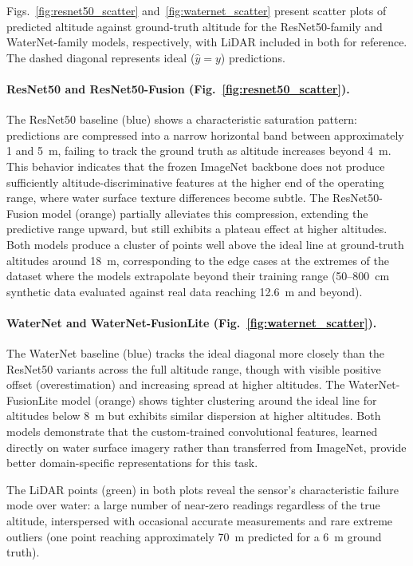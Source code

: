Figs.~\ref{fig:resnet50_scatter} and~\ref{fig:waternet_scatter} present scatter plots of predicted altitude against ground-truth altitude for the ResNet50-family and WaterNet-family models, respectively, with LiDAR included in both for reference. The dashed diagonal represents ideal ($\hat{y} = y$) predictions.

\paragraph{ResNet50 and ResNet50-Fusion (Fig.~\ref{fig:resnet50_scatter}).} The ResNet50 baseline (blue) shows a characteristic saturation pattern: predictions are compressed into a narrow horizontal band between approximately 1 and 5~m, failing to track the ground truth as altitude increases beyond 4~m. This behavior indicates that the frozen ImageNet backbone does not produce sufficiently altitude-discriminative features at the higher end of the operating range, where water surface texture differences become subtle. The ResNet50-Fusion model (orange) partially alleviates this compression, extending the predictive range upward, but still exhibits a plateau effect at higher altitudes. Both models produce a cluster of points well above the ideal line at ground-truth altitudes around 18~m, corresponding to the edge cases at the extremes of the dataset where the models extrapolate beyond their training range (50--800~cm synthetic data evaluated against real data reaching 12.6~m and beyond).

\paragraph{WaterNet and WaterNet-FusionLite (Fig.~\ref{fig:waternet_scatter}).} The WaterNet baseline (blue) tracks the ideal diagonal more closely than the ResNet50 variants across the full altitude range, though with visible positive offset (overestimation) and increasing spread at higher altitudes. The WaterNet-FusionLite model (orange) shows tighter clustering around the ideal line for altitudes below 8~m but exhibits similar dispersion at higher altitudes. Both models demonstrate that the custom-trained convolutional features, learned directly on water surface imagery rather than transferred from ImageNet, provide better domain-specific representations for this task.

The LiDAR points (green) in both plots reveal the sensor's characteristic failure mode over water: a large number of near-zero readings regardless of the true altitude, interspersed with occasional accurate measurements and rare extreme outliers (one point reaching approximately 70~m predicted for a 6~m ground truth).


